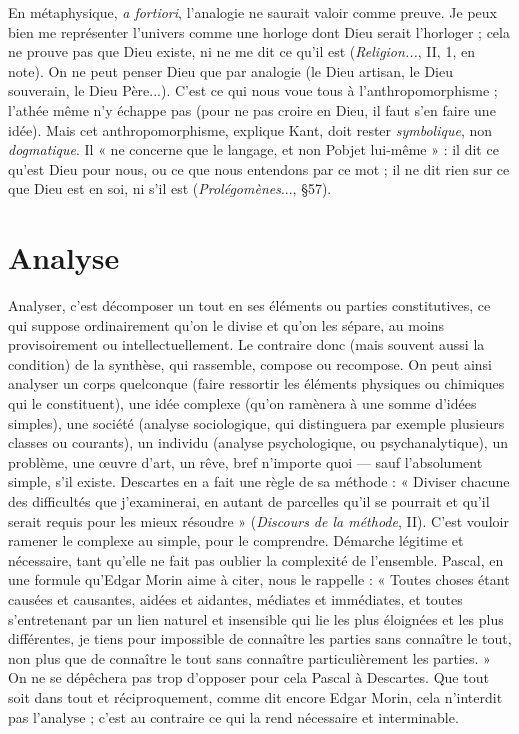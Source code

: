 En métaphysique, {\it a fortiori}, l'analogie ne saurait valoir comme preuve. Je
peux bien me représenter l’univers comme une horloge dont Dieu serait
l’horloger ; cela ne prouve pas que Dieu existe, ni ne me dit ce qu’il est ({\it Religion...},
II, 1, en note). On ne peut penser Dieu que par analogie (le Dieu
artisan, le Dieu souverain, le Dieu Père...). C’est ce qui nous voue tous à
l’anthropomorphisme ; l’athée même n’y échappe pas (pour ne pas croire en
Dieu, il faut s’en faire une idée). Mais cet anthropomorphisme, explique Kant,
doit rester {\it symbolique}, non {\it dogmatique}. Il « ne concerne que le langage, et non
Pobjet lui-même » : il dit ce qu’est Dieu pour nous, ou ce que nous entendons
par ce mot ; il ne dit rien sur ce que Dieu est en soi, ni s’il est ({\it Prolégomènes}...,
\S 57).

\section{Analyse}
Analyser, c’est décomposer un tout en ses éléments ou parties
constitutives, ce qui suppose ordinairement qu’on le divise et
qu'on les sépare, au moins provisoirement ou intellectuellement. Le contraire
donc (mais souvent aussi la condition) de la synthèse, qui rassemble, compose
ou recompose. On peut ainsi analyser un corps quelconque (faire ressortir les
éléments physiques ou chimiques qui le constituent), une idée complexe
(qu'on ramènera à une somme d’idées simples), une société (analyse sociologique,
qui distinguera par exemple plusieurs classes ou courants), un individu
(analyse psychologique, ou psychanalytique), un problème, une œuvre d’art,
un rêve, bref n'importe quoi — sauf l’absolument simple, s’il existe. Descartes
en a fait une règle de sa méthode : « Diviser chacune des difficultés que j’examinerai,
en autant de parcelles qu’il se pourrait et qu’il serait requis pour les
mieux résoudre » ({\it Discours de la méthode}, II). C’est vouloir ramener le complexe
au simple, pour le comprendre. Démarche légitime et nécessaire, tant
qu'elle ne fait pas oublier la complexité de l’ensemble. Pascal, en une formule
qu'Edgar Morin aime à citer, nous le rappelle : « Toutes choses étant causées et
causantes, aidées et aidantes, médiates et immédiates, et toutes s’entretenant
par un lien naturel et insensible qui lie les plus éloignées et les plus différentes,
je tiens pour impossible de connaître les parties sans connaître le tout, non plus
que de connaître le tout sans connaître particulièrement les parties. » On ne se
dépêchera pas trop d’opposer pour cela Pascal à Descartes. Que tout soit dans
tout et réciproquement, comme dit encore Edgar Morin, cela n’interdit pas
l'analyse ; c’est au contraire ce qui la rend nécessaire et interminable.

